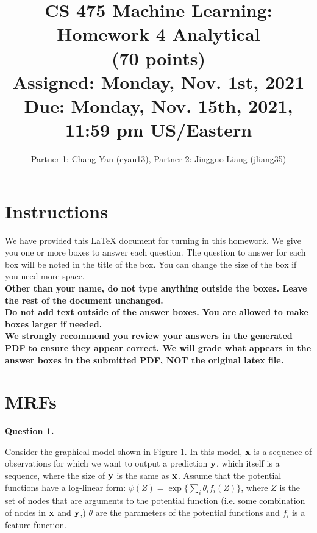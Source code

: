 \documentclass[11pt]{article}
\title{CS 475 Machine Learning: Homework 4 Analytical \\
(70 points)\\
\Large{Assigned: Monday, Nov. 1st, 2021} \\
\Large{Due: Monday, Nov. 15th, 2021, 11:59 pm US/Eastern}}
\author{Partner 1: Chang Yan (cyan13), Partner 2:  Jingguo Liang (jliang35)}
\date{}
\newcommand{\vx}{{\bf x}}
\newcommand{\vy}{{\bf y}}
\begin{document}
\maketitle
\thispagestyle{headings}

\section*{Instructions }
We have provided this \LaTeX{} document for turning in this homework. We give you one or more boxes to answer each question.  The question to answer for each box will be noted in the title of the box.  You can change the size of the box if you need more space.\\

{\bf Other than your name, do not type anything outside the boxes. Leave the rest of the document unchanged.}\\


\textbf{
  Do
  not add text outside of the answer boxes.  You are allowed to make boxes larger if needed.
  }\\


\textbf{We strongly recommend you review your answers in the generated PDF to
  ensure they appear correct. We will grade what appears in the answer boxes in
  the submitted PDF, NOT the original latex file.}


\pagebreak
\section*{MRFs}

{\bf Question 1.}

Consider the graphical model shown in Figure 1. In this model, $\vx$ is a sequence of observations for which we want to output a prediction $\vy$, which itself is a sequence, where the size of $\vy$ is the same as $\vx$. Assume that the potential functions have a log-linear form: $\psi(Z) = \exp\{\sum_i \theta_i f_i(Z)\}$, where $Z$ is the set of nodes that are arguments to the potential function (i.e. some combination of nodes in $\vx$ and $\vy$,) $\theta$ are the parameters of the potential functions and $f_i$ is a feature function.
\end{document}
